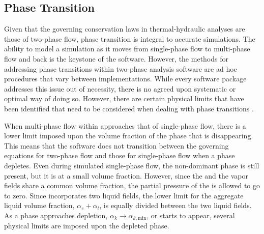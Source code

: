 \subsection{Phase Transition}
\label{subsect:nlnPhaseTransition}
Given that the governing conservation laws in thermal-hydraulic analyses are those of two-phase flow, phase transition is integral to accurate simulations.
The ability to model a simulation as it moves from single-phase flow to multi-phase flow and back is the keystone of the software.
However, the methods for addressing phase transitions within two-phase analysis software are ad hoc procedures that vary between implementations.
While every software package addresses this issue out of necessity, there is no agreed upon systematic or optimal way of doing so.
However, there are certain physical limits that have been identified that need to be considered when dealing with phase transitions \cite{Bestion2000}.

When multi-phase flow within \cobra{} approaches that of single-phase flow, there is a lower limit imposed upon the volume fraction of the phase that is disappearing.
This means that the software does not transition between the governing equations for two-phase flow and those for single-phase flow when a phase depletes.
Even during simulated single-phase flow, the non-dominant phase is still present, but it is at a small volume fraction.
However, since the \ncgs{} and the vapor fields share a common volume fraction, the partial pressure of the \ncgs{} is allowed to go to zero. 
Since \cobra{} incorporates two liquid fields, the lower limit for the aggregate liquid volume fraction, $\alpha_e + \alpha_l$, is equally divided between the two liquid fields.
As a phase approaches depletion, $\alpha_k \rightarrow \alpha_{k,\text{min}}$, or starts to appear, several physical limits are imposed upon the depleted phase.

